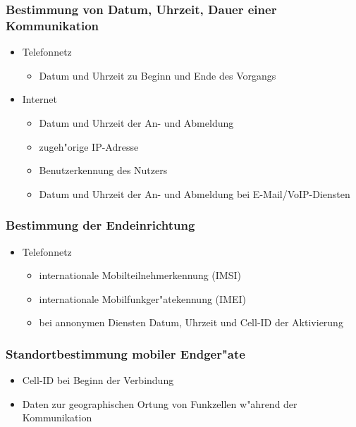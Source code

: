    \begin{frame}
      \frametitle{Bestimmung von Datum, Uhrzeit, Dauer einer Kommunikation}
      \begin{itemize}
        \item Telefonnetz
        \begin{itemize}
          \item Datum und Uhrzeit zu Beginn und Ende des Vorgangs
        \end{itemize}
        \item Internet
        \begin{itemize}
          \item Datum und Uhrzeit der An- und Abmeldung
          \item zugeh"orige IP-Adresse
          \item Benutzerkennung des Nutzers
          \item Datum und Uhrzeit der An- und Abmeldung bei E-Mail/VoIP-Diensten
        \end{itemize}
      \end{itemize}
    \end{frame}

    \begin{frame}
      \frametitle{Bestimmung der Endeinrichtung}
      \begin{itemize}
        \item Telefonnetz
        \begin{itemize}
          \item internationale Mobilteilnehmerkennung (IMSI)
          \item internationale Mobilfunkger"atekennung (IMEI)
          \item bei annonymen Diensten Datum, Uhrzeit und Cell-ID der Aktivierung
        \end{itemize}
      \end{itemize}
    \end{frame}

    \begin{frame}
      \frametitle{Standortbestimmung mobiler Endger"ate}
      \begin{itemize}
        \item Cell-ID bei Beginn der Verbindung
        \item Daten zur geographischen Ortung von Funkzellen w"ahrend der Kommunikation
      \end{itemize}
    \end{frame}